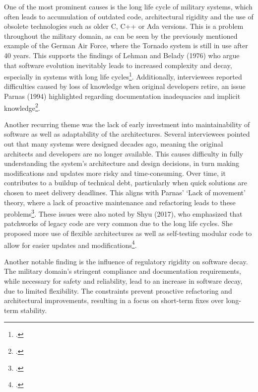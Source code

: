 One of the most prominent causes is the long life cycle of military systems, which often leads to accumulation of outdated code, architectural rigidity and the use of obsolete technologies such as older C, C++ or Ada versions.
This is a problem throughout the military domain, as can be seen by the previously mentioned example of the German Air Force, where the Tornado system is still in use after 40 years.
This supports the findings of Lehman and Belady (1976) who argue that software evolution inevitably leads to increased complexity and decay, especially in systems with long life cycles\footcite[228]{beladyModelLargeProgram1976}.
Additionally, interviewees reported difficulties caused by loss of knowledge when original developers retire, an issue Parnas (1994) highlighted regarding documentation inadequacies and implicit knowledge\footcite[280-281]{296790}.

Another recurring theme was the lack of early investment into maintainability of software as well as adaptability of the architectures. Several interviewees pointed out that many systems were designed decades ago, meaning the original architects and developers are no longer available.
This causes difficulty in fully understanding the system's architecture and design decisions, in turn making modifications and updates more risky and time-consuming. 
Over time, it contributes to a buildup of technical debt, particularly when quick solutions are chosen to meet delivery deadlines.
This aligns with Parnas' `Lack of movement' theory, where a lack of proactive maintenance and refactoring leads to these problems\footcite[280]{296790}.
These issues were also noted by Shyu (2017), who emphasized that patchworks of legacy code are very common due to the long life cycles. She proposed more use of flexible architectures as well as self-testing modular code to allow for easier updates and modifications\footcite[15-17]{shyu2017military}.

Another notable finding is the influence of regulatory rigidity on software decay. The military domain's stringent compliance and documentation requirements, while necessary for safety and reliability, lead to an increase in software decay, due to limited flexibility.
The constraints prevent proactive refactoring and architectural improvements, resulting in a focus on short-term fixes over long-term stability.

